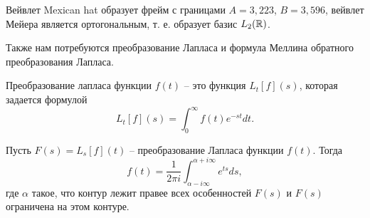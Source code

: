 \documentclass[../paper.tex]{subfiles}
\begin{document}
Вейвлет Mexican hat образует фрейм с границами $A=3{,}223$, $B = 3{,}596$, вейвлет Мейера является ортогональным, т. е. образует базис $L_2(\mathbb{R})$.

Также нам потребуются преобразование Лапласа и формула Меллина обратного преобразования Лапласа.
\begin{Def}
Преобразование лапласа функции $f(t)$ -- это функция $L_t [f](s)$, которая задается формулой
\[
	L_t [f](s) = \int_0^\infty f(t) e^{-st} dt
.\]

\begin{Lem*}
Пусть $F(s) = L_s [f](t)$ -- преобразование Лапласа функции $f(t)$. Тогда
\[
	f(t) = \frac{1}{2\pi i} \int_{\alpha - i \infty}^{\alpha + i \infty} e^{ts} ds
,\] где $\alpha$ такое, что контур лежит правее всех особенностей $F(s)$ и $F(s)$ ограничена на этом контуре.
\end{Lem*}
\end{Def}
\end{document}

